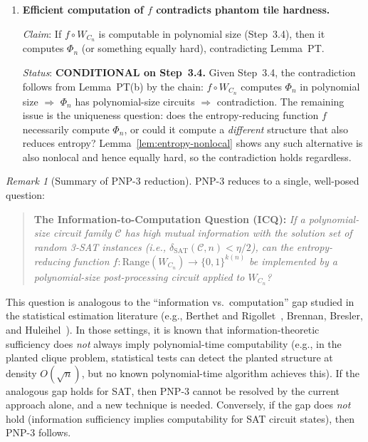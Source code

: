 \documentclass[11pt]{article}
\theoremstyle{definition}
\theoremstyle{remark}
\newtheorem{remark}[theorem]{Remark}
\newcommand{\calC}{\mathcal{C}}
\newcommand{\dSAT}{\delta_{\mathrm{SAT}}}
\begin{document}
\begin{enumerate}[label=\textbf{3.\arabic*},nosep,leftmargin=2em]
    \textbf{Partial progress}: If the circuit $C_n$ is \emph{oblivious}
    (its gate pattern does not depend on the input), then $f$ can be
    computed by a circuit of size $O(|C_n|^2)$ via standard circuit
    composition.  For general non-oblivious circuits, the argument
    requires a decomposition of $W_{C_n}$ into structured components
    --- this is \textbf{TO BE PROVED}.

  \item \textbf{Efficient computation of $f$ contradicts phantom tile
    hardness.}

    \textit{Claim}: If $f \circ W_{C_n}$ is computable in polynomial
    size (Step~3.4), then it computes $\Phi_n$ (or something equally hard),
    contradicting Lemma~PT.

    \textit{Status}: \textbf{CONDITIONAL on Step~3.4.}  Given Step~3.4,
    the contradiction follows from Lemma~PT(b) by the chain:
    $f \circ W_{C_n}$ computes $\Phi_n$ in polynomial size $\Rightarrow$
    $\Phi_n$ has polynomial-size circuits $\Rightarrow$ contradiction.
    The remaining issue is the uniqueness question: does the
    entropy-reducing function $f$ necessarily compute $\Phi_n$, or
    could it compute a \emph{different} structure that also reduces
    entropy?  Lemma~\ref{lem:entropy-nonlocal} shows any such
    alternative is also nonlocal and hence equally hard, so the
    contradiction holds regardless.
\end{enumerate}

\begin{remark}[Summary of PNP-3 reduction]
PNP-3 reduces to a single, well-posed question:

\begin{quote}
\textbf{The Information-to-Computation Question (ICQ):}
\emph{If a polynomial-size circuit family $\calC$ has high mutual
information with the solution set of random 3-SAT instances (i.e.,
$\dSAT(\calC, n) < \eta/2$), can the entropy-reducing function
$f: \mathrm{Range}(W_{C_n}) \to \{0,1\}^{k(n)}$ be implemented by
a polynomial-size post-processing circuit applied to $W_{C_n}$?}
\end{quote}

\noindent
This question is analogous to the ``information vs.\ computation''
gap studied in the statistical estimation literature (e.g.,
Berthet and Rigollet~\cite{BR13}, Brennan, Bresler, and
Huleihel~\cite{BBH20}).  In those settings, it is known that
information-theoretic sufficiency does \emph{not} always imply
polynomial-time computability (e.g., in the planted clique problem,
statistical tests can detect the planted structure at density
$O(\sqrt{n})$, but no known polynomial-time algorithm achieves this).
If the analogous gap holds for SAT, then PNP-3 cannot be resolved
by the current approach alone, and a new technique is needed.
Conversely, if the gap does \emph{not} hold (information sufficiency
implies computability for SAT circuit states), then PNP-3 follows.
\end{remark}
\end{document}
